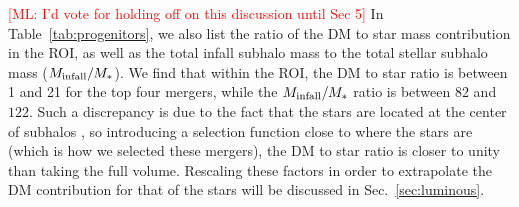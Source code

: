 \documentclass[twocolumn,preprintnumbers]{aastex6}
\newcommand{\FeH}{\text{[Fe/H]} }
\DeclareRobustCommand{\Sec}[1]{Sec.~\ref{#1}}
\newcommand{\zacc}{z_\mathrm{acc}}
\def\ML#1{\textcolor{red}{[ML: #1]}}
\begin{document}


\ML{I'd vote for holding off on this discussion until Sec 5}
In  Table~\ref{tab:progenitors}, we also list the ratio of the DM to star mass contribution in the ROI, as well as the total infall subhalo mass to the total stellar subhalo mass ($M_{\rm{infall}}/M_*$). We find that within the ROI, the DM to star ratio is between 1 and 21 for the top four mergers, while the $M_{\rm{infall}}/M_*$ ratio is between $82$ and $122$. Such a discrepancy is due to the fact that the stars are located at the center of subhalos \citep{}, so introducing a selection function close to where the stars are (which is how we selected these mergers), the DM to star ratio is closer to unity than taking the full volume. Rescaling these factors in order to extrapolate the DM contribution for that of the stars will be discussed in \Sec{sec:luminous}. 
\end{document}
